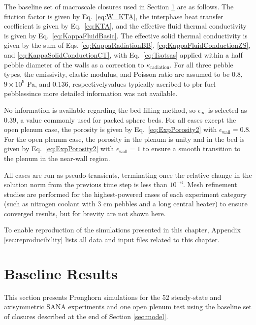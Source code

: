 The baseline set of macroscale closures used in Section \ref{sec:baseline} are as follows. The friction factor is given by Eq.\ \eqref{eq:W_KTA}, the interphase heat transfer coefficient is given by Eq.\ \eqref{eq:KTA}, and the effective fluid thermal conductivity is given by Eq.\ \eqref{eq:KappaFluidBasic}. The effective solid thermal conductivity is given by the sum of Eqs. \eqref{eq:KappaRadiationBB}, \eqref{eq:KappaFluidConductionZS}, and \eqref{eq:KappaSolidConductionCT}, with Eq.\ \eqref{eq:Tsotsas} applied within a half pebble diameter of the walls as a correction to \(\kappa_\text{radiation}\). For all three pebble types, the emissivity, elastic modulus, and Poisson ratio are assumed to be 0.8, \(9\times10^9\) Pa, and 0.136, respectively\mdash values typically ascribed to \gls{pbr} fuel pebbles\mdash since more detailed information was not available. 

No information is available regarding the bed filling method, so \(\epsilon_\infty\) is selected as 0.39, a value commonly used for packed sphere beds. For all cases except the open plenum case, the porosity is given by Eq.\ \eqref{eq:ExpPorosity2} with \(\epsilon_\text{wall}=0.8\). For the open plenum case, the porosity in the plenum is unity and in the bed is given by Eq.\ \eqref{eq:ExpPorosity2} with \(\epsilon_\text{wall}=1\) to ensure a smooth transition to the plenum in the near-wall region.

All cases are run as pseudo-transients, terminating once the relative change in the solution norm from the previous time step is less than \(10^{-6}\). Mesh refinement studies are performed for the highest-powered cases of each experiment category (such as nitrogen coolant with 3 \si{\centi\meter} pebbles and a long central heater) to ensure converged results, but for brevity are not shown here. 

To enable reproduction of the simulations presented in this chapter, Appendix \ref{sec:reproducibility} lists all data and input files related to this chapter.

\section{Baseline Results}
\label{sec:baseline}

This section presents Pronghorn simulations for the 52 steady-state and axisymmetric SANA experiments and one open plenum test using the baseline set of closures described at the end of Section \ref{sec:model}. 

